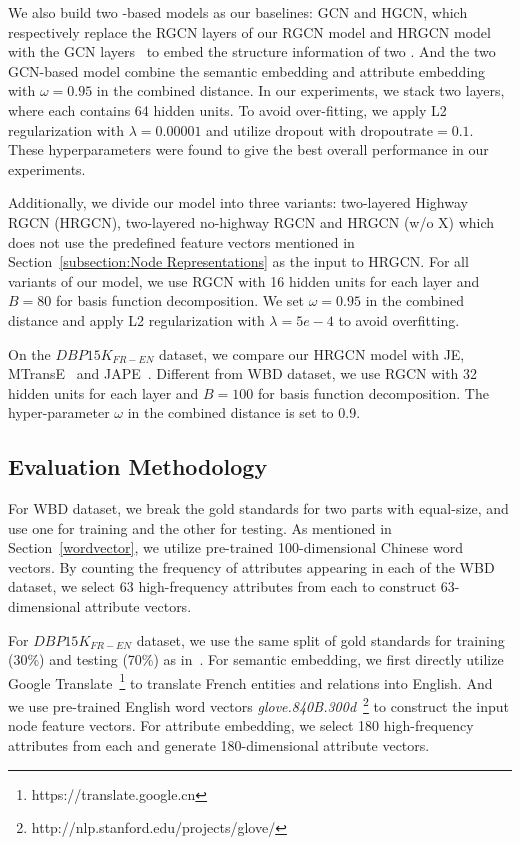 	We also build two \GCN-based models as our baselines: GCN and HGCN, which respectively replace the RGCN layers of our RGCN model and HRGCN model with the GCN layers~\cite{Kipf2016Semi} to embed the structure information of two \KGs.
	And the two GCN-based model combine the semantic embedding and attribute embedding with $\omega=0.95$ in the combined distance.
	In our experiments, we stack two \GCN layers, where each \GCN contains 64 hidden units.
	To avoid over-fitting, we apply L2 regularization with $\lambda=0.00001$ and utilize dropout with $\mathrm{dropout rate}=0.1$.
	These hyperparameters were found to give the best overall performance in our experiments.
	
	Additionally, we divide our model into three variants: two-layered Highway RGCN (HRGCN), two-layered no-highway RGCN and HRGCN (w/o X) which does not use the predefined feature vectors mentioned in Section~\ref{subsection:Node Representations} as the input to HRGCN. For all variants of our model, we use RGCN with 16 hidden units for each layer and $B = 80$ for basis function decomposition.
	We set $\omega=0.95$ in the combined distance and apply L2 regularization with $\lambda=5e-4$ to avoid overfitting.
	
	On the $DBP15K_{FR-EN}$ dataset, we compare our HRGCN model with JE, MTransE~\cite{chen2016multilingual} and JAPE~\cite{sun2017cross}.
	Different from WBD dataset, we use RGCN with 32 hidden units for each layer and $B = 100$ for basis function decomposition.
	The hyper-parameter $\omega$ in the combined distance is set to 0.9.



	\subsection{Evaluation Methodology}
	
	For WBD dataset, we break the gold standards for two parts with equal-size, and use one for training and the other for testing.
	As mentioned in Section~\ref{wordvector}, we utilize pre-trained 100-dimensional Chinese word vectors.
	By counting the frequency of attributes appearing in each \KG of the WBD dataset, we select 63 high-frequency attributes from each \KG to construct 63-dimensional attribute vectors.
	
	For $DBP15K_{FR-EN}$ dataset, we use the same split of gold standards for training (30\%) and testing (70\%) as in~\cite{sun2017cross}.
	For semantic embedding, we first directly utilize Google Translate~\footnote{https://translate.google.cn} to translate French entities and relations into English.
	And we use pre-trained English word vectors \emph{glove.840B.300d}~\footnote{http://nlp.stanford.edu/projects/glove/} to construct the input node feature vectors.
	For attribute embedding, we select 180 high-frequency attributes from each \KG and generate 180-dimensional attribute vectors.
	
